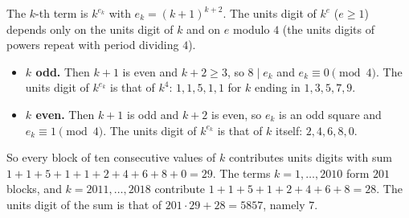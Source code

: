 The $k$-th term is $k^{e_k}$ with $e_k=(k+1)^{k+2}$. The units digit of $k^e$ ($e\ge1$) depends only on the units digit of $k$ and on $e$ modulo $4$ (the units digits of powers repeat with period dividing $4$).
\begin{itemize}
\item \textbf{$k$ odd.} Then $k+1$ is even and $k+2\ge3$, so $8\mid e_k$ and $e_k\equiv0\pmod4$. The units digit of $k^{e_k}$ is that of $k^4$: $1,1,5,1,1$ for $k$ ending in $1,3,5,7,9$.
\item \textbf{$k$ even.} Then $k+1$ is odd and $k+2$ is even, so $e_k$ is an odd square and $e_k\equiv1\pmod4$. The units digit of $k^{e_k}$ is that of $k$ itself: $2,4,6,8,0$.
\end{itemize}
So every block of ten consecutive values of $k$ contributes units digits with sum $1+1+5+1+1+2+4+6+8+0=29$. The terms $k=1,\dots,2010$ form $201$ blocks, and $k=2011,\dots,2018$ contribute $1+1+5+1+2+4+6+8=28$. The units digit of the sum is that of $201\cdot29+28=5857$, namely $\boxed{7}$.
